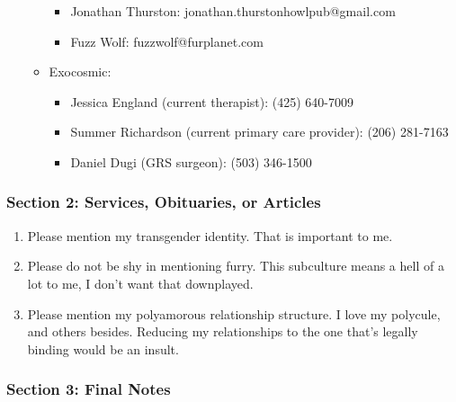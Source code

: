 \begin{enumerate}
\begin{itemize}
    \begin{itemize}
    \tightlist
    \item
      Jonathan Thurston: jonathan.thurstonhowlpub@gmail.com
    \item
      Fuzz Wolf: fuzzwolf@furplanet.com
    \end{itemize}
  \item
    Exocosmic:

    \begin{itemize}
    \tightlist
    \item
      Jessica England (current therapist): (425) 640-7009
    \item
      Summer Richardson (current primary care provider): (206) 281-7163
    \item
      Daniel Dugi (GRS surgeon): (503) 346-1500
    \end{itemize}
  \end{itemize}
\end{enumerate}

\hypertarget{section-2-services-obituaries-or-articles}{%
\subsubsection*{Section 2: Services, Obituaries, or Articles}\label{section-2-services-obituaries-or-articles}}

\begin{enumerate}
\def\labelenumi{\arabic{enumi}.}
\tightlist
\item
  Please mention my transgender identity. That is important to me.
\item
  Please do not be shy in mentioning furry. This subculture means a hell of a lot to me, I don't want that downplayed.
\item
  Please mention my polyamorous relationship structure. I love my polycule, and others besides. Reducing my relationships to the one that's legally binding would be an insult.
\end{enumerate}

\hypertarget{section-3-final-notes}{%
\subsubsection*{Section 3: Final Notes}\label{section-3-final-notes}}

